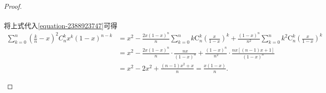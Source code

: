 \documentclass[../../main.tex]{subfiles}
\begin{document}
\begin{proof}
\begin{enumerate}
\begin{gather*}
\end{gather*}
将上式代入\eqref{equation-2388923747}可得
\begin{align*}
\sum_{k=0}^n{\left( \frac{k}{n}-x \right) ^2C_{n}^{k}x^k\left( 1-x \right) ^{n-k}}&=x^2-\frac{2x\left( 1-x \right) ^n}{n}\sum_{k=0}^n{k\mathrm{C}_{n}^{k}\left( \frac{x}{1-x} \right) ^k}+\frac{\left( 1-x \right) ^n}{n^2}\sum_{k=0}^n{k^2\mathrm{C}_{n}^{k}\left( \frac{x}{1-x} \right) ^k}
\\
&=x^2-\frac{2x\left( 1-x \right) ^n}{n}\cdot \frac{nx}{\left( 1-x \right) ^n}+\frac{\left( 1-x \right) ^n}{n^2}\cdot \frac{nx\left[ \left( n-1 \right) x+1 \right]}{\left( 1-x \right) ^n}
\\
&=x^2-2x^2+\frac{\left( n-1 \right) x^2+x}{n}=\frac{x\left( 1-x \right)}{n}.
\end{align*}
\end{enumerate}

\end{proof}
\end{document}

